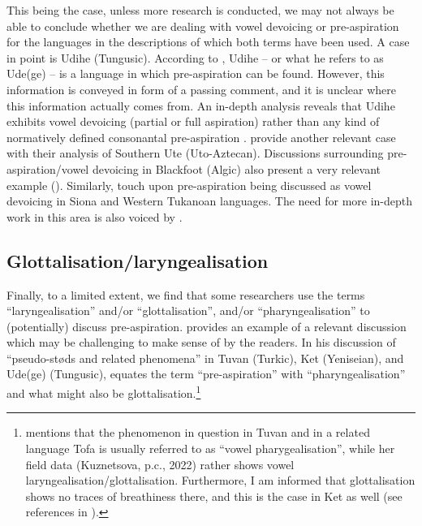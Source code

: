 \documentclass[output=paper]{langscibook}
\begin{document}
This being the case, unless more research is conducted, we may not always be able to conclude whether we are dealing with vowel devoicing or pre\hyp aspiration for the languages in the descriptions of which both terms have been used. A case in point is Udihe (Tungusic). According to \citet[126, 300]{Liberman1982}, Udihe – or what he refers to as Ude(ge) – is a language in which pre\hyp aspiration can be found. However, this information is conveyed in form of a passing comment, and it is unclear where this information actually comes from. An in-depth analysis reveals that Udihe exhibits vowel devoicing (partial or full aspiration) rather than any kind of normatively defined consonantal pre\hyp aspiration \citep{Kuznetsova2022}. \citet{OberlyKharlamov2015} provide another relevant case with their analysis of Southern Ute (Uto-Aztecan). Discussions surrounding pre-aspiration/vowel devoicing in Blackfoot (Algic) also present a very relevant example (\citealt{ReisSilva2008}). Similarly,  touch upon pre\hyp aspiration being discussed as vowel devoicing in Siona and Western Tukanoan languages. The need for more in-depth work in this area is also voiced by \citet[55]{Stenzel2004}.

\subsection{Glottalisation/laryngealisation}\label{sec:hejna:2.5}

Finally, to a limited extent, we find that some researchers use the terms “laryngealisation” and/or “glottalisation”, and/or “pharyngealisation” to (potentially) discuss pre-aspiration. \citet[149]{Hejná2015} provides an example of a relevant discussion which may be challenging to make sense of by the readers. In his discussion of “pseudo-støds and related phenomena” in Tuvan (Turkic), Ket (Yeniseian), and Ude(ge) (Tungusic), \citet[126--127]{Liberman1982} equates the term “pre-aspiration” with “pharyngealisation” and what might also be glottalisation.\footnote{\citet{Kuznetsova2022} mentions that the phenomenon in question in Tuvan and in a related language Tofa is usually referred to as “vowel pharygealisation”, while her field data (Kuznetsova, p.c., 2022) rather shows vowel laryngealisation/glottalisation. Furthermore, I am informed that glottalisation shows no traces of breathiness there, and this is the case in Ket as well (see references in \citealt{Kuznetsova2022}).}
\end{document}

